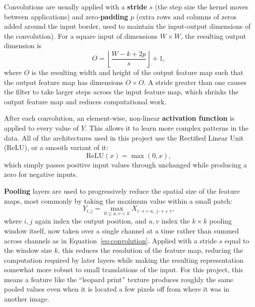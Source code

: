 Convolutions are usually applied with a \textbf{stride} $s$ (the step size the kernel moves between applications) and zero-\textbf{padding} $p$ (extra rows and columns of zeros added around the input border, used to maintain the input-output dimensions of the convolution). For a square input of dimensions $W \times W$, the resulting output dimension is
\begin{equation}
O = \left\lfloor \frac{W - k + 2p}{s} \right\rfloor + 1,
\label{eq:conv_output_size}
\end{equation}
where $O$ is the resulting width and height of the output feature map such that the output feature map has dimensions $O \times O$. A stride greater than one causes the filter to take larger steps across the input feature map, which shrinks the output feature map and reduces computational work.

After each convolution, an element-wise, non-linear \textbf{activation function} is applied to every value of $Y$. This allows it to learn more complex patterns in the data. All of the architectures used in this project use the Rectified Linear Unit (ReLU), or a smooth variant of it:
\begin{equation}
\mathrm{ReLU}(x) = \max(0, x),
\label{eq:relu}
\end{equation}
which simply passes positive input values through unchanged while producing a zero for negative inputs.

\textbf{Pooling} layers are used to progressively reduce the spatial size of the feature maps, most commonly by taking the maximum value within a small patch:
\begin{equation}
Y_{i,j} = \max_{0 \le u,v < k} X_{i \cdot s + u,\ j \cdot s + v},
\label{eq:maxpool}
\end{equation}
where $i,j$ again index the output position, and $u,v$ index the $k \times k$ pooling window itself, now taken over a single channel at a time rather than summed across channels as in Equation~\ref{eq:convolution}. Applied with a stride $s$ equal to the window size $k$, this reduces the resolution of the feature map, reducing the computation required by later layers while making the resulting representation somewhat more robust to small translations of the input. For this project, this means a feature like the ``leopard print'' texture produces roughly the same pooled values even when it is located a few pixels off from where it was in another image.

